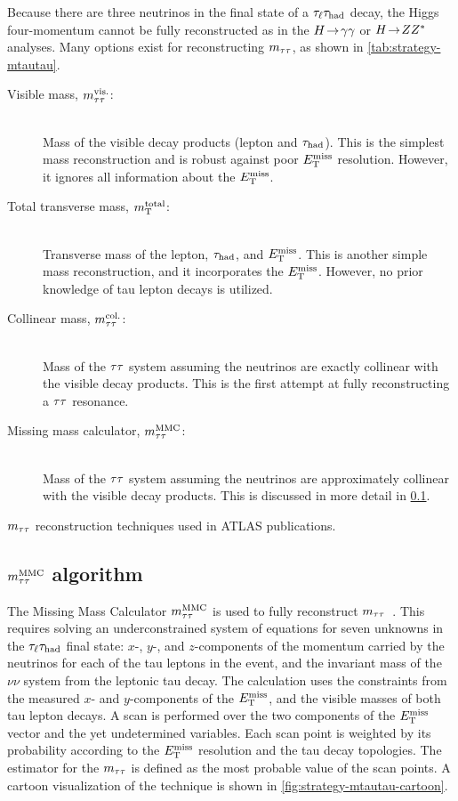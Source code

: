 Because there are three neutrinos in the final state of a $\tau_\ell\tau_\text{had}$ decay, the Higgs four-momentum cannot be fully reconstructed as in the $H \!\rightarrow\! \gamma\gamma$ or $H \!\rightarrow\! ZZ^\ast$ analyses. Many options exist for reconstructing $m_{\tau\tau}$, as shown in \cref{tab:strategy-mtautau}.
%
\begin{description}
    \item[Visible mass, $m_{\tau\tau}^\text{vis.}$:] \hfill \\
      Mass of the visible decay products (lepton and $\tau_\text{had}$). This is the simplest mass reconstruction and is robust against poor $E_{\mathrm{T}}^{\mathrm{miss}}$ resolution. However, it ignores all information about the $E_{\mathrm{T}}^{\mathrm{miss}}$.
    \item[Total transverse mass, $m_{\text{T}}^\text{total}$:] \hfill \\
      Transverse mass of the lepton, $\tau_\text{had}$, and $E_{\mathrm{T}}^{\mathrm{miss}}$. This is another simple mass reconstruction, and it incorporates the $E_{\mathrm{T}}^{\mathrm{miss}}$. However, no prior knowledge of tau lepton decays is utilized.
    \item[Collinear mass, $m_{\tau\tau}^\text{col.}$:] \hfill \\
      Mass of the $\tau\tau$ system assuming the neutrinos are exactly collinear with the visible decay products. This is the first attempt at fully reconstructing a $\tau\tau$ resonance.
    \item[Missing mass calculator, $m_{\tau\tau}^\text{MMC}$:] \hfill \\
      Mass of the $\tau\tau$ system assuming the neutrinos are approximately collinear with the visible decay products. This is discussed in more detail in \cref{sec:strategy-mtautau-mMMC}.
\end{description}
%

\begin{table}[bp]
  \centering
  \renewcommand{\arraystretch}{1.4}
  \caption{$m_{\tau\tau}$ reconstruction techniques used in ATLAS publications.}
  
  \label{tab:strategy-mtautau}
\end{table}

\subsection{$m_{\tau\tau}^\text{MMC}$ algorithm}
\label{sec:strategy-mtautau-mMMC}

The Missing Mass Calculator $m_{\tau\tau}^\text{MMC}$ is used to fully reconstruct $m_{\tau\tau}$~\cite{2011.mmc}. This requires solving an underconstrained system of equations for seven unknowns in the $\tau_\ell\tau_\text{had}$ final state: $x$-, $y$-, and $z$-components of the momentum carried by the neutrinos for each of the tau leptons in the event, and the invariant mass of the $\nu\nu$ system from the leptonic tau decay. The calculation uses the constraints from the measured $x$- and $y$-components of the $E_{\mathrm{T}}^{\mathrm{miss}}$, and the visible masses of both tau lepton decays. A scan is performed over the two components of the $E_{\mathrm{T}}^{\mathrm{miss}}$ vector and the yet undetermined variables. Each scan point is weighted by its probability according to the $E_{\mathrm{T}}^{\mathrm{miss}}$ resolution and the tau decay topologies. The estimator for the $m_{\tau\tau}$ is defined as the most probable value of the scan points. A cartoon visualization of the technique is shown in \cref{fig:strategy-mtautau-cartoon}.

